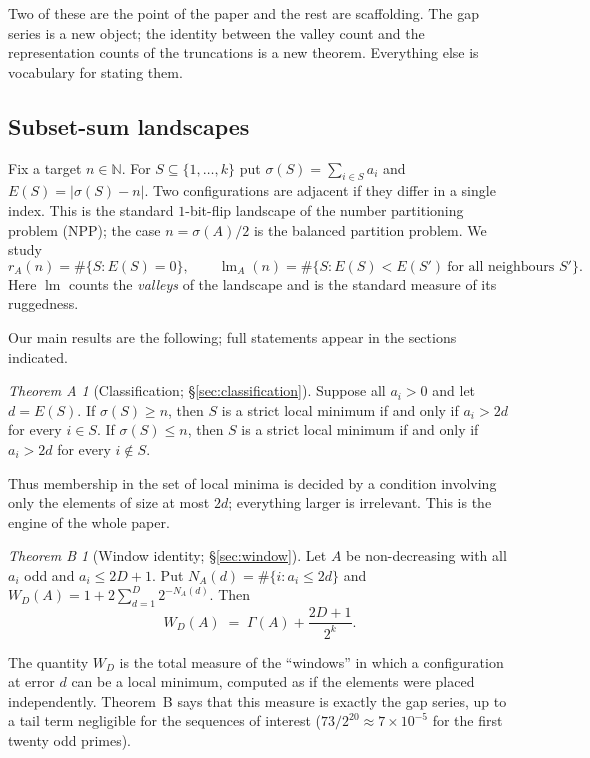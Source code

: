 \documentclass[11pt,a4paper]{article}
\theoremstyle{plain}
\theoremstyle{definition}
\theoremstyle{remark}
\newtheorem{theoremA}{Theorem A}
\newtheorem{theoremB}{Theorem B}
\DeclareMathOperator{\lm}{lm}
\begin{document}
\noindent
Two of these are the point of the paper and the rest are scaffolding. The gap
series is a new object; the identity between the valley count and the
representation counts of the truncations is a new theorem. Everything else is
vocabulary for stating them.

\subsection{Subset-sum landscapes}

Fix a target $n\in\mathbb{N}$. For $S\subseteq\{1,\dots,k\}$ put
$\sigma(S)=\sum_{i\in S}a_i$ and $E(S)=|\sigma(S)-n|$. Two configurations are
adjacent if they differ in a single index. This is the standard $1$-bit-flip
landscape of the number partitioning problem (NPP); the case
$n=\sigma(A)/2$ is the balanced partition problem. We study
\[
  r_A(n)=\#\{S: E(S)=0\},
  \qquad
  \lm_A(n)=\#\{S: E(S)<E(S')\ \text{for all neighbours }S'\}.
\]
Here $\lm$ counts the \emph{valleys} of the landscape and is the standard
measure of its ruggedness.

Our main results are the following; full statements appear in the sections
indicated.

\begin{theoremA}[Classification; \S\ref{sec:classification}]
Suppose all $a_i>0$ and let $d=E(S)$. If $\sigma(S)\ge n$, then $S$ is a strict
local minimum if and only if $a_i>2d$ for every $i\in S$. If $\sigma(S)\le n$,
then $S$ is a strict local minimum if and only if $a_i>2d$ for every $i\notin S$.
\end{theoremA}

Thus membership in the set of local minima is decided by a condition involving
only the elements of size at most $2d$; everything larger is irrelevant. This is
the engine of the whole paper.

\begin{theoremB}[Window identity; \S\ref{sec:window}]
Let $A$ be non-decreasing with all $a_i$ odd and $a_i\le2D+1$. Put
$N_A(d)=\#\{i:a_i\le2d\}$ and $W_D(A)=1+2\sum_{d=1}^{D}2^{-N_A(d)}$. Then
\[
  W_D(A)\;=\;\Gamma(A)+\frac{2D+1}{2^{k}}.
\]
\end{theoremB}

The quantity $W_D$ is the total measure of the ``windows'' in which a
configuration at error $d$ can be a local minimum, computed as if the elements
were placed independently. Theorem~B says that this measure is exactly the gap
series, up to a tail term negligible for the sequences of interest
($73/2^{20}\approx7\times10^{-5}$ for the first twenty odd primes).
\end{document}
